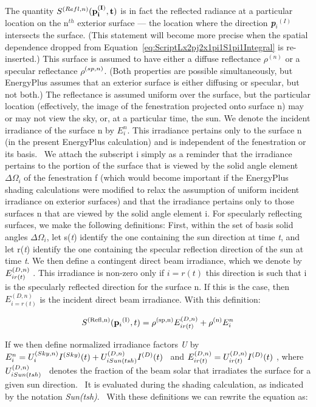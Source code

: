 The quantity \(S^{(Refl,n)} (\bf{p}_i^{(I)},t)\) is in fact the reflected radiance at a particular location on the n\(^{th}\) exterior surface --- the location where the direction \textbf{\emph{p}}\emph{\(_{i}\)}\(^{(I)}\) intersects the surface. (This statement will become more precise when the spatial dependence dropped from Equation~\ref{eq:ScriptLx2pj2x1pi1S1pi1Integral} is re-inserted.) This surface is assumed to have either a diffuse reflectance \(\rho\)\(^{(n)}\) or a specular reflectance \(\rho\)\(^{(sp,\\ n)}\). (Both properties are possible simultaneously, but EnergyPlus assumes that an exterior surface is either diffusing or specular, but not both.) The reflectance is assumed uniform over the surface, but the particular location (effectively, the image of the fenestration projected onto surface n) may or may not view the sky, or, at a particular time, the sun. We denote the incident irradiance of the surface n by \(E_i^n\). This irradiance pertains only to the surface n (in the present EnergyPlus calculation) and is independent of the fenestration or its basis.~ We attach the subscript i simply as a reminder that the irradiance pertains to the portion of the surface that is viewed by the solid angle element \(\Delta {\Omega_i}\) of the fenestration f (which would become important if the EnergyPlus shading calculations were modified to relax the assumption of uniform incident irradiance on exterior surfaces) and that the irradiance pertains only to those surfaces n that are viewed by the solid angle element i. For specularly reflecting surfaces, we make the following definitions: First, within the set of basis solid angles \(\Delta {\Omega_i}\), let s(\emph{t}) identify the one containing the sun direction at time \emph{t}, and let r(\emph{t}) identify the one containing the specular reflection direction of the sun at time \emph{t}. We then define a contingent direct beam irradiance, which we denote by \(E_{i{\rm{ }}r(t)}^{(D,n)}\) . This irradiance is non-zero only if \(i = r(t)\) this direction is such that i is the specularly reflected direction for the surface n. If this is the case, then \(E_{i = r(t)}^{(D,n)}\) is the incident direct beam irradiance. With this definition:

\begin{equation}
{S^{{\rm{(Refl, n)}}}}({{\bf{p}}_i}^{{\rm{(I)}}},t) = {\rho ^{{\rm{(sp, n)}}}}E_{i{\rm{ }}r(t)}^{(D,n)} + {\rho ^{{\rm{(n)}}}}E_i^n
\end{equation}

If we then define normalized irradiance factors \emph{U} by \(E_i^n = U_i^{(Sky,n)}{I^{(Sky)}}(t) + U_{i{\rm{ }}Sun(tsh)}^{(D,n)}{I^{(D)}}(t)\) ~and \(E_{i{\rm{ }}r(t)}^{(D,n)} = U_{i{\rm{ }}r(t)}^{(D,n)}{I^{(D)}}(t)\) , where \(U_{i{\rm{ }}Sun(tsh)}^{(D,n)}\) ~denotes the fraction of the beam solar that irradiates the surface for a given sun direction.~ It is evaluated during the shading calculation, as indicated by the notation \emph{Sun(tsh)}.~ With these definitions we can rewrite the equation as:

